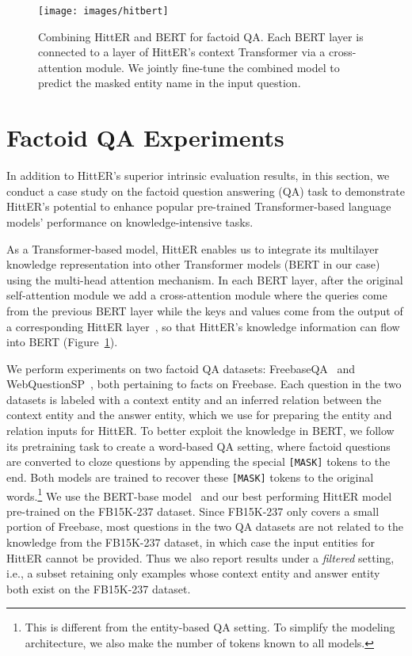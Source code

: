 \documentclass[11pt]{article}
\begin{document}
\begin{figure}[t]
  \centering
  \texttt{[image: images/hitbert]}
  \caption{Combining HittER and BERT for factoid QA. Each BERT layer is connected to a layer of HittER's context Transformer via a cross-attention module. We jointly fine-tune the combined model to predict the masked entity name in the input question.}
  \label{fig:hitbert}
\end{figure}

\section{Factoid QA Experiments}
\label{sec:qa-experimens}

In addition to HittER's superior intrinsic evaluation results, in this section, we conduct a case study on the factoid question answering (QA) task to demonstrate HittER's potential to enhance popular pre-trained Transformer-based language models' performance on knowledge-intensive tasks.

As a Transformer-based model, HittER enables us to integrate its multilayer knowledge representation into other Transformer models (BERT in our case) using the multi-head attention mechanism.
In each BERT layer, after the original self-attention module we add a cross-attention module where the queries come from the previous BERT layer while the keys and values come from the output of a corresponding HittER layer~\cite{vaswani2017attention}, so that HittER's knowledge information can flow into BERT (Figure~\ref{fig:hitbert}).


We perform experiments on two factoid QA datasets: FreebaseQA~\cite{jiang-etal-2019-freebaseqa} and WebQuestionSP~\cite{yih-etal-2016-value}, both pertaining to facts on Freebase.
Each question in the two datasets is labeled with a context entity and an inferred relation between the context entity and the answer entity, which we use for preparing the entity and relation inputs for HittER.
To better exploit the knowledge in BERT, we follow its pretraining task to create a word-based QA setting, where factoid questions are converted to cloze questions by appending the special \texttt{[MASK]} tokens to the end.
Both models are trained to recover these \texttt{[MASK]} tokens to the original words.\footnote{This is different from the entity-based QA setting. To simplify the modeling architecture, we also make the number of tokens known to all models.}
We use the BERT-base model~\cite{devlin-etal-2019-bert} and our best performing HittER model pre-trained on the FB15K-237 dataset.
Since FB15K-237 only covers a small portion of Freebase, most questions in the two QA datasets are not related to the knowledge from the FB15K-237 dataset, in which case the input entities for HittER cannot be provided.
Thus we also report results under a \emph{filtered} setting, i.e., a subset retaining only examples whose context entity and answer entity both exist on the FB15K-237 dataset.
\end{document}
